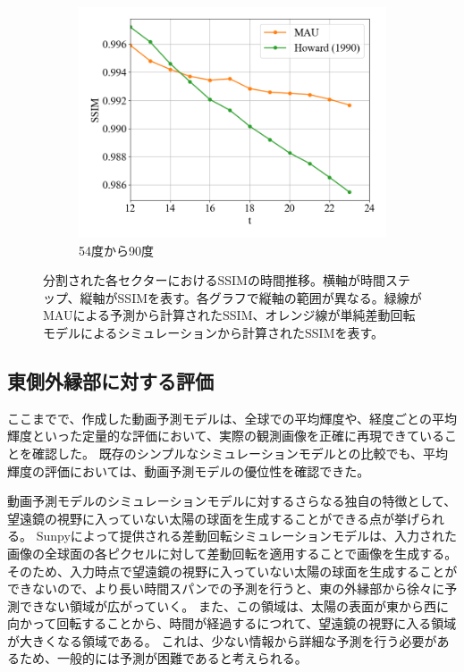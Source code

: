 \begin{figure}[htbp]
\begin{subfigure}{0.5\textwidth}
              \includegraphics[width=\textwidth]{figures/exp1/lng_ssim_5.png}
              \caption{54度から90度}
            \end{subfigure}
            \caption{分割された各セクターにおけるSSIMの時間推移。横軸が時間ステップ、縦軸がSSIMを表す。各グラフで縦軸の範囲が異なる。緑線がMAUによる予測から計算されたSSIM、オレンジ線が単純差動回転モデルによるシミュレーションから計算されたSSIMを表す。}
            \label{fig:exp1_lng_ssim}
          \end{figure}

    
    \subsection{東側外縁部に対する評価}
    \label{subsec:exp1_limb}
      ここまでで、作成した動画予測モデルは、全球での平均輝度や、経度ごとの平均輝度といった定量的な評価において、実際の観測画像を正確に再現できていることを確認した。
      既存のシンプルなシミュレーションモデルとの比較でも、平均輝度の評価においては、動画予測モデルの優位性を確認できた。

      動画予測モデルのシミュレーションモデルに対するさらなる独自の特徴として、望遠鏡の視野に入っていない太陽の球面を生成することができる点が挙げられる。
      Sunpyによって提供される差動回転シミュレーションモデルは、入力された画像の全球面の各ピクセルに対して差動回転を適用することで画像を生成する。
      そのため、入力時点で望遠鏡の視野に入っていない太陽の球面を生成することができないので、より長い時間スパンでの予測を行うと、東の外縁部から徐々に予測できない領域が広がっていく。
      また、この領域は、太陽の表面が東から西に向かって回転することから、時間が経過するにつれて、望遠鏡の視野に入る領域が大きくなる領域である。
      これは、少ない情報から詳細な予測を行う必要があるため、一般的には予測が困難であると考えられる。

